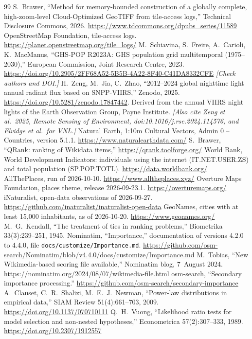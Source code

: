 \documentclass[10pt,twocolumn]{article}
\newcommand{\todo}[1]{{\color{red!60!black}\itshape[#1]}}
\newcommand{\code}[1]{\texttt{#1}}
\begin{document}
\begin{thebibliography}{99}\small
{} S.~Brawer, \enquote{Method for memory-bounded construction
  of a globally complete, high-zoom-level Cloud-Optimized GeoTIFF from
  tile-access logs,} Technical Disclosure Commons, 2026.
  \url{https://www.tdcommons.org/dpubs_series/11589}
 OpenStreetMap Foundation, tile-access logs.
  \url{https://planet.openstreetmap.org/tile_logs/}
 M.~Schiavina, S.~Freire, A.~Carioli, K.~MacManus,
  \enquote{GHS-POP R2023A: GHS population grid multitemporal
  (1975--2030),} European Commission, Joint Research Centre, 2023.
  \url{https://doi.org/10.2905/2FF68A52-5B5B-4A22-8F40-C41DA8332CFE}
  \todo{Check authors and DOI.}
 H.~Zeng, M.~Jia, C.~Zhao, \enquote{2012--2024 global
  nighttime light annual radiant flux based on SNPP-VIIRS,} Zenodo, 2025.
  \url{https://doi.org/10.5281/zenodo.17847442}. Derived from the annual
  VIIRS night lights of the Earth Observation Group, Payne Institute.
  \todo{Also cite Zeng et al.\ 2025, Remote Sensing of Environment,
  doi:10.1016/j.rse.2024.114576, and Elvidge et al.\ for VNL.}
 Natural Earth, 1:10m Cultural Vectors, Admin 0 --
  Countries, version 5.1.1. \url{https://www.naturalearthdata.com/}
 S.~Brawer, \enquote{QRank: ranking of Wikidata items,}
  \url{https://qrank.toolforge.org/}
 World Bank, World Development Indicators: individuals using
  the internet (IT.NET.USER.ZS) and total population (SP.POP.TOTL).
  \url{https://data.worldbank.org/}
 AllThePlaces, run of 2026-10-10.
  \url{https://www.alltheplaces.xyz/}
 Overture Maps Foundation, places theme, release
  2026-09-23.1. \url{https://overturemaps.org/}
 iNaturalist, open-data observations of 2026-09-27.
  \url{https://github.com/inaturalist/inaturalist-open-data}
 GeoNames, cities with at least 15{,}000 inhabitants,
  as of 2026-10-20. \url{https://www.geonames.org/}
 M.~G.~Kendall, \enquote{The treatment of ties in ranking
  problems,} Biometrika 33(3):239--251, 1945.
 Nominatim, \enquote{Importance,} documentation of
  versions 4.2.0 to 4.4.0, file \code{docs/customize/Importance.md}.
  \url{https://github.com/osm-search/Nominatim/blob/v4.4.0/docs/customize/Importance.md}
 M.~Tobias, \enquote{New Wikimedia-based scoring
  file available,} Nominatim blog, 7~August 2024.
  \url{https://nominatim.org/2024/08/07/wikimedia-file.html}
 osm-search, \enquote{Secondary importance
  processing.} \url{https://github.com/osm-search/secondary-importance}
 A.~Clauset, C.~R.~Shalizi, M.~E.~J.~Newman,
  \enquote{Power-law distributions in empirical data,} SIAM Review
  51(4):661--703, 2009. \url{https://doi.org/10.1137/070710111}
 Q.~H.~Vuong, \enquote{Likelihood ratio tests for model
  selection and non-nested hypotheses,} Econometrica 57(2):307--333, 1989.
  \url{https://doi.org/10.2307/1912557}
\end{thebibliography}
\end{document}
